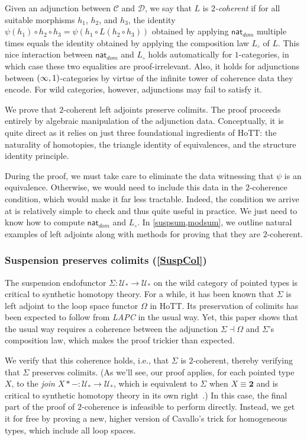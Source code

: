 \documentclass[10pt,a4paper]{article}
\theoremstyle{definition}
\theoremstyle{remark}
\newcommand{\C}{\mathcal C}
\newcommand{\D}{\mathcal D}
\newcommand{\U}{\mathcal{U}}
\newcommand{\dom}{\textit{dom}}
\newcommand{\nat}{\mathsf{nat}}
\newcommand{\0}{\mathbf{0}}
\newcommand{\1}{\mathbf{1}}
\newcommand{\2}{\mathbf{2}}
\begin{document}
Given an adjunction between $\C$ and $\D$, we say that $L$ is \emph{$2$-coherent} if for all suitable morphisms $h_1$, $h_2$, and $h_3$, the identity $\psi(h_1) \circ h_2 \circ h_3 = \psi(h_1 \circ L(h_2 \circ h_3))$ obtained by applying $\nat_{\dom}$ multiple times equals the identity obtained by applying the composition law $L_{\circ}$ of $L$. 
This nice interaction between $\nat_{\dom}$ and $L_{\circ}$ holds automatically for $1$-categories, in which case these two equalities are proof-irrelevant. Also, it holds for adjunctions between $\mleft(\infty,1\mright)$-categories by virtue of the infinite tower of coherence data they encode. For wild categories, however, adjunctions may fail to satisfy it.

We prove that $2$-coherent left adjoints preserve colimits. The proof proceeds entirely by algebraic manipulation of the adjunction data. Conceptually, it is quite direct as it relies on just three foundational ingredients of HoTT: the naturality of homotopies, the triangle identity of equivalences, and the structure identity principle. 

During the proof, we must take care to eliminate the data witnessing that $\psi$ is an equivalence. Otherwise, we would need to include this data in the $2$-coherence condition, which would make it far less tractable. Indeed, the condition we arrive at is relatively simple to check and thus quite useful in practice. We just need to know how to compute $\nat_{\dom}$ and $L_{\circ}$. In \cref{suspsum,modsum}, we outline natural examples of left adjoints along with methods for proving that they are $2$-coherent.

\subsubsection{Suspension preserves colimits (\autoref{SuspCol})} \label{suspsum}

The suspension endofunctor $\Sigma : \U_{\ast} \to \U_{\ast}$ on the wild category of pointed types is  critical to synthetic homotopy theory. For a while, it has been known that $\Sigma$ is left adjoint to the loop space functor $\Omega$ in HoTT. Its preservation of colimits has been expected to follow from \emph{LAPC} in the usual way. Yet, this paper shows that the usual way requires a  coherence between the adjunction $\Sigma \dashv \Omega$ and $\Sigma$'s composition law, which makes the proof trickier than expected. 

We verify that this coherence holds, i.e., that $\Sigma$ is $2$-coherent, thereby verifying that $\Sigma$ preserves colimits. (As we'll see, our proof applies, for each pointed type $X$, to the \emph{join} $X \ast {-} : \U_{\ast} \to \U_{\ast}$, which is equivalent to $\Sigma$ when $X \equiv \2$ and is critical to synthetic homotopy theory in its own right~\cite{brunthesis,rijkejoin}.) In this case, the final part of the proof of $2$-coherence is infeasible to perform  directly. Instead, we get it for free by proving a new, higher version of Cavallo's trick for homogeneous types, which include all loop spaces. 
\end{document}
